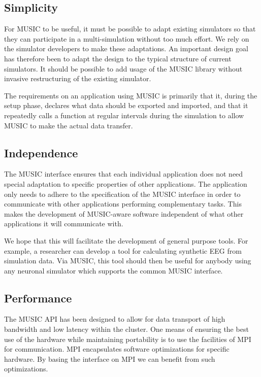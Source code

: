 \documentclass[a4paper,twoside]{report}
\begin{document}
\subsection{Simplicity}
\label{sec:simplicity}

For MUSIC to be useful, it must be possible to adapt existing
simulators so that they can participate in a multi-simulation without
too much effort.  We rely on the simulator developers to make these
adaptations.  An important design goal has therefore been to adapt the
design to the typical structure of current simulators.  It should be
possible to add usage of the MUSIC library without invasive
restructuring of the existing simulator.

The requirements on an application using MUSIC is primarily that it,
during the setup phase, declares what data should be exported and
imported, and that it repeatedly calls a function at regular intervals
during the simulation to allow MUSIC to make the actual data transfer.


\subsection{Independence}

The MUSIC interface ensures that each individual application does not
need special adaptation to specific properties of other applications.
The application only needs to adhere to the specification of the MUSIC
interface in order to communicate with other applications performing
complementary tasks.  This makes the development of MUSIC-aware
software independent of what other applications it will communicate
with.

We hope that this will facilitate the development of general purpose
tools.  For example, a researcher can develop a tool for calculating
synthetic EEG from simulation data.  Via MUSIC, this tool should then
be useful for anybody using any neuronal simulator which supports the
common MUSIC interface.


\subsection{Performance}

The MUSIC API has been designed to allow for data transport of high
bandwidth and low latency within the cluster.  One means of ensuring
the best use of the hardware while maintaining portability is to use
the facilities of MPI for communication.  MPI encapsulates software
optimizations for specific hardware. By basing the interface on MPI we
can benefit from such optimizations.
\end{document}
